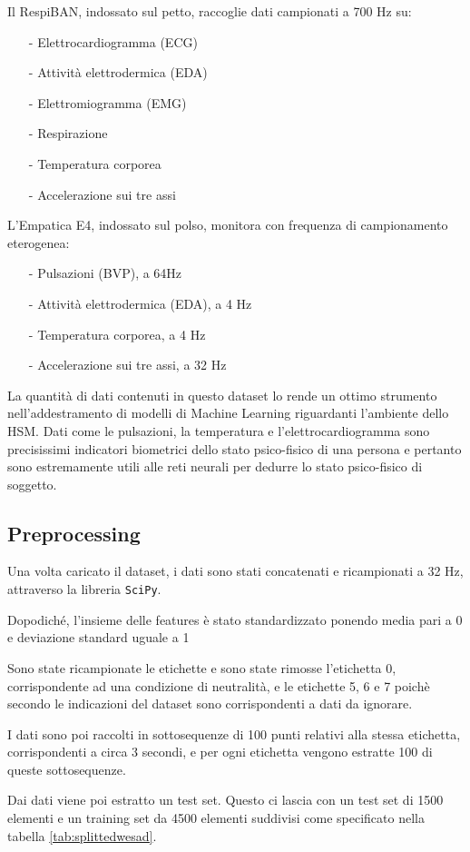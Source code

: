 Il RespiBAN, indossato sul petto, raccoglie dati campionati a 700 Hz su:
\begin{itemize}
    \item[-] Elettrocardiogramma (ECG)
    \item[-] Attività elettrodermica (EDA)
    \item[-] Elettromiogramma (EMG)
    \item[-] Respirazione
    \item[-] Temperatura corporea
    \item[-] Accelerazione sui tre assi
\end{itemize}
L'Empatica E4, indossato sul polso, monitora con frequenza di campionamento eterogenea:
\begin{itemize}
    \item[-] Pulsazioni (BVP), a 64Hz
    \item[-] Attività elettrodermica (EDA), a 4 Hz
    \item[-] Temperatura corporea, a 4 Hz
    \item[-] Accelerazione sui tre assi, a 32 Hz
\end{itemize}
La quantità di dati contenuti in questo dataset lo rende un ottimo strumento nell'addestramento di modelli di Machine Learning riguardanti l'ambiente dello HSM. Dati come le pulsazioni, la temperatura e l'elettrocardiogramma sono precisissimi indicatori biometrici dello stato psico-fisico di una persona e pertanto sono estremamente utili alle reti neurali per dedurre lo stato psico-fisico di soggetto.
\subsection{Preprocessing}
Una volta caricato il dataset, i dati sono stati concatenati e ricampionati a 32 Hz, attraverso la libreria \texttt{SciPy}.

Dopodiché, l'insieme delle features è stato standardizzato ponendo media pari a 0 e deviazione standard uguale a 1

Sono state ricampionate le etichette e sono state rimosse l'etichetta 0, corrispondente ad una condizione di neutralità, e le etichette 5, 6 e 7 poichè secondo le indicazioni del dataset sono corrispondenti a dati da ignorare.



I dati sono poi raccolti in sottosequenze di 100 punti relativi alla stessa etichetta, corrispondenti a circa 3 secondi, e per ogni etichetta vengono estratte 100 di queste sottosequenze.

Dai dati viene poi estratto un test set. Questo ci lascia con un test set di 1500 elementi e un training set da 4500 elementi suddivisi come specificato nella tabella \ref{tab:splittedwesad}.

